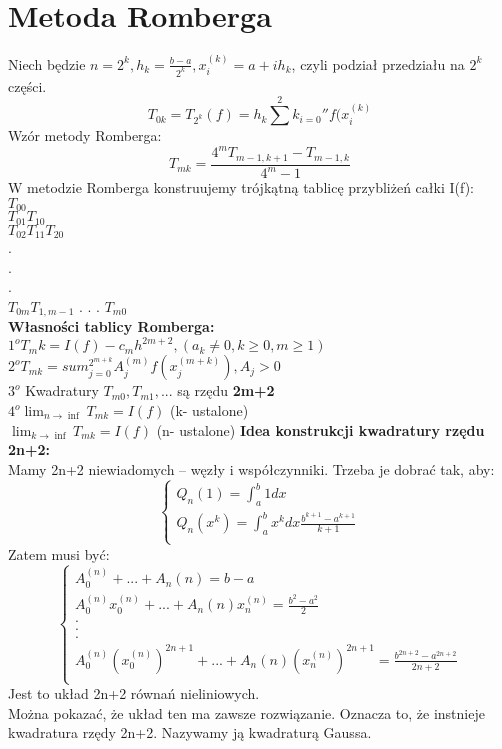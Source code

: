 \documentclass[12pt]{article}
\begin{document}
\section*{Metoda Romberga}
Niech będzie $n=2^k, h_k=\frac{b-a}{2^k}, x_i^{(k)}=a + ih_k$, czyli podział przedziału na $2^k$ części.
$$T_{0k} = T_{2^k}(f) = h_k \sum^2k_{i=0} ''f(x_i^{(k)}$$
Wzór metody Romberga:
$$T_{mk} = \frac{4^mT_{m-1,k+1}-T_{m-1,k}}{4^m -1}$$ 
W metodzie Romberga konstruujemy trójkątną tablicę przybliżeń całki I(f):\\
$T_{00}$\\
$T_{01} T_{10}$\\
$T_{02} T_{11} T_{20}$\\
.\\
.\\
.\\
$T_{0m} T_{1,m-1}$ . . . $T_{m0}$\\
\linebreak
\textbf{Własności tablicy Romberga:}\\
\linebreak
$1^{o} T_mk = I(f) - c_m h^{2m+2},(a_k \neq 0, k \geq 0, m \geq 1)$\\
\linebreak
$2^{o} T_{mk} = sum^{2^{m+k}}_{j=0} A_j^{(m)}f(x_j^{(m+k)}), A_j > 0$\\
\linebreak
$3^{o}$ Kwadratury $T_{m0},T_{m1},...$ są rzędu \textbf{2m+2}\\
\linebreak
$4^{o} \lim_{n\rightarrow \inf} T_{mk} = I(f) $ (k- ustalone)\\

$\lim_{k\rightarrow \inf} T_{mk} = I(f) $ (n- ustalone)
\newpage
\textbf{Idea konstrukcji kwadratury rzędu 2n+2:}\\
Mamy 2n+2 niewiadomych -- węzły i współczynniki. Trzeba je dobrać tak, aby:
$$
\left\{ \begin{array}{l}
Q_n(1) = \int^b_a 1dx\\
Q_n(x^k) = \int^b_a x^kdx\frac{b^{k+1} - a ^{k+1}}{k+1}\\
\end{array} \right.
$$
Zatem musi być:
$$
\left\{ \begin{array}{l}
A_0^{(n)} + ... + A_n{(n)} = b-a\\
A_0^{(n)}x_0^{(n)} + ... + A_n{(n)}x^{(n)}_n = \frac{b^2-a^2}{2}\\
.\\
.\\
.\\
A_0^{(n)}(x_0^{(n)})^{2n+1} + ... + A_n{(n)}(x^{(n)}_n)^{2n+1}  = \frac{b^{2n+2}-a^{2n+2}}{2n+2}\\
\end{array} \right.
$$
Jest to układ 2n+2 równań nieliniowych.\\
Można pokazać, że układ ten ma zawsze rozwiązanie. Oznacza to, że instnieje kwadratura rzędy 2n+2. Nazywamy ją kwadraturą Gaussa.
\end{document}
